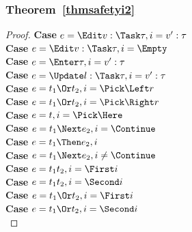 \subsubsection{Theorem~\ref{thmsafetyi2}}
\begin{proof}
  \noindent\textbf{Case} $e=\Edit v:\Task\tau, i= v':\tau$\\
  \noindent\textbf{Case} $e=\Edit v:\Task\tau, i= \Empty$\\
  \noindent\textbf{Case} $e=\Enter \tau, i= v':\tau$\\
  \noindent\textbf{Case} $e=\Update l:\Task\tau, i= v':\tau$\\
  \noindent\textbf{Case} $e=t_1\Or t_2 , i= \Pick\Left r $\\
  \noindent\textbf{Case} $e=t_1\Or t_2 , i= \Pick\Right r $\\
  \noindent\textbf{Case} $e=t, i= \Pick\Here $\\
  \noindent\textbf{Case} $e=t_1\Next e_2 , i= \Continue $\\
  \noindent\textbf{Case} $e=t_1\Then e_2 , i$\\
  \noindent\textbf{Case} $e=t_1\Next e_2 , i\neq\Continue$\\
  \noindent\textbf{Case} $e=t_1\And t_2 , i=\First i$\\
  \noindent\textbf{Case} $e=t_1\And t_2 , i=\Second i$\\
  \noindent\textbf{Case} $e=t_1\Or t_2 , i=\First i$\\
  \noindent\textbf{Case} $e=t_1\Or t_2 , i=\Second i$\\
\end{proof}
